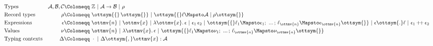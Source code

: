 { \small
    \begin{align*}
      &\text{Types}        &\mathcal{A}, \mathcal{B}, \mathcal{C} \Coloneqq&~  \mathbb{Z}  ~|~ \mathcal{A}  \rightarrow  \mathcal{B} ~|~ \rho  \\
      &\text{Record types} &\rho  \Coloneqq&~ \ottsym{\{}  \,  \ottsym{\}} ~|~ \ottsym{\{}  \ell  \Mapsto  \mathcal{A}  \mid  \rho  \ottsym{\}}  \\
      &\text{Expressions}  &\epsilon  \Coloneqq&~ \ottmv{n} ~|~ \ottmv{x} ~|~
                                               \lambda \ottmv{x} .\, \epsilon  ~|~ \epsilon_{{\mathrm{1}}} \, \epsilon_{{\mathrm{2}}}
                                              ~|~\ottsym{\{}  \ell_{{\mathrm{1}}}  \Mapsto  \epsilon_{{\mathrm{1}}}  ; \, \, ... \, ; \,  \ell_{\ottmv{n}}  \Mapsto  \epsilon_{\ottmv{n}}  \ottsym{\}} ~|~ \epsilon  \ottsym{.}  \ell~|~ \epsilon_{{\mathrm{1}}}  \,{+}\!{+}\,  \epsilon_{{\mathrm{2}}} \\
      &\text{Values}       &\nu \Coloneqq&~ \ottmv{n} ~|~  \lambda \ottmv{x} .\, \epsilon  ~|~ \ottsym{\{}  \ell_{{\mathrm{1}}}  \Mapsto  \nu_{{\mathrm{1}}}  ; \, \, ... \, ; \,  \ell_{\ottmv{n}}  \Mapsto  \nu_{\ottmv{n}}  \ottsym{\}} \\
      &\text{Typing contexts} &\Delta \Coloneqq&~  \cdot ~|~ \Delta  \ottsym{,}  \ottmv{x}  :  \mathcal{A} %
    \end{align*}
}

